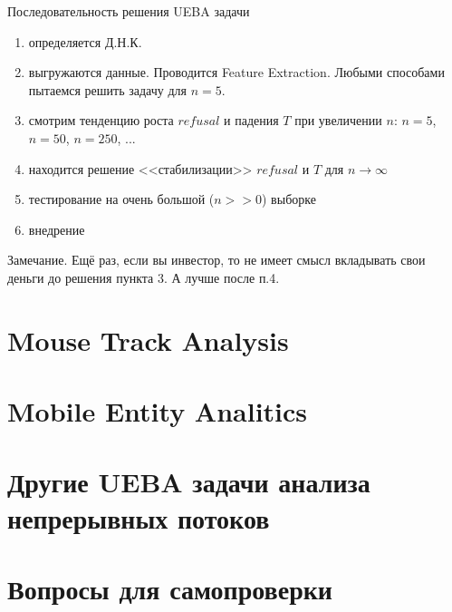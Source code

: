 \begin{frame}{Последовательность решения UEBA задачи}
	\begin{enumerate}
		\item определяется Д.Н.К.
		\item выгружаются данные. Проводится Feature Extraction. 
		Любыми способами пытаемся решить задачу для $n=5$.
		\item смотрим тенденцию роста $refusal$ и падения $T$
		при увеличении $n$: $n=5$, $n=50$, $n=250$, ...
		\item находится решение <<стабилизации>>
		 $refusal$ и  $T$ для $n \longrightarrow \infty$
		\item тестирование на очень большой ($n >> 0$) выборке 
		\item внедрение
	\end{enumerate}
	\begin{block}{Замечание.}
		Ещё раз, если вы инвестор, то не имеет смысл вкладывать свои деньги
		до решения пункта 3. А лучше после п.4.
	\end{block}
\end{frame}

\section{Mouse Track Analysis}\label{section:mca}




\section{Mobile Entity Analitics}\label{section:mea}

\section{Другие UEBA задачи анализа непрерывных потоков}\label{section:ueba_other}

\section{Вопросы для самопроверки}

